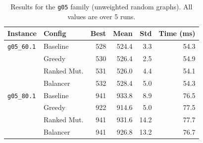 \documentclass[12pt]{article}
\begin{document}
\begin{table}[H]
\centering
\begin{tabular}{|l|l|r|r|r|r|}
\toprule
\textbf{Instance} & \textbf{Config} & \textbf{Best} & \textbf{Mean} & \textbf{Std} & \textbf{Time (ms)} \\
\midrule
\texttt{g05\_60.1} & \cellcolor{clrBaseline!25}Baseline    & \cellcolor{clrBaseline!25}528 & \cellcolor{clrBaseline!25}524.4 & \cellcolor{clrBaseline!25}3.3  & \cellcolor{clrBaseline!25}54.3 \\
                   & \cellcolor{clrGreedy!25}Greedy        & \cellcolor{clrGreedy!25}530   & \cellcolor{clrGreedy!25}526.4  & \cellcolor{clrGreedy!25}2.5   & \cellcolor{clrGreedy!25}54.9  \\
                   & \cellcolor{clrRanked!25}Ranked Mut.   & \cellcolor{clrRanked!25}531   & \cellcolor{clrRanked!25}526.0  & \cellcolor{clrRanked!25}4.4   & \cellcolor{clrRanked!25}54.1  \\
                   & \cellcolor{clrBalancer!25}Balancer    & \cellcolor{clrBalancer!25}532 & \cellcolor{clrBalancer!25}528.4 & \cellcolor{clrBalancer!25}5.0 & \cellcolor{clrBalancer!25}54.3 \\
\midrule
\texttt{g05\_80.1} & \cellcolor{clrBaseline!25}Baseline    & \cellcolor{clrBaseline!25}941 & \cellcolor{clrBaseline!25}933.8 & \cellcolor{clrBaseline!25}8.9  & \cellcolor{clrBaseline!25}76.5 \\
                   & \cellcolor{clrGreedy!25}Greedy        & \cellcolor{clrGreedy!25}922   & \cellcolor{clrGreedy!25}914.6  & \cellcolor{clrGreedy!25}5.0   & \cellcolor{clrGreedy!25}77.5  \\
                   & \cellcolor{clrRanked!25}Ranked Mut.   & \cellcolor{clrRanked!25}941   & \cellcolor{clrRanked!25}931.6  & \cellcolor{clrRanked!25}14.2  & \cellcolor{clrRanked!25}77.7  \\
                   & \cellcolor{clrBalancer!25}Balancer    & \cellcolor{clrBalancer!25}941 & \cellcolor{clrBalancer!25}926.8 & \cellcolor{clrBalancer!25}13.2 & \cellcolor{clrBalancer!25}76.7 \\
\bottomrule
\end{tabular}
\caption{Results for the \texttt{g05} family (unweighted random graphs).
         All values are over 5 runs.}
\label{tab:results-g05}
\end{table}
\end{document}
